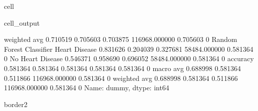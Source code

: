 \documentclass[letterpaper,10pt,english]{jupyterBook}
\begin{document}
\begin{sphinxuseclass}{cell}
\begin{sphinxVerbatimOutput}
\begin{sphinxuseclass}{cell_output}
\begin{sphinxVerbatim}[commandchars=\\\{\}]
                           weighted avg      0.710519   0.705603  0.703875  116968.000000  0.705603    0
Random Forest Classifier   Heart Disease     0.831626   0.204039  0.327681  58484.000000   0.581364    0
                           No Heart Disease  0.546371   0.958690  0.696052  58484.000000   0.581364    0
                           accuracy          0.581364   0.581364  0.581364  0.581364       0.581364    0
                           macro avg         0.688998   0.581364  0.511866  116968.000000  0.581364    0
                           weighted avg      0.688998   0.581364  0.511866  116968.000000  0.581364    0
Name: dummy, dtype: int64

border2
\PYGZhy{}\PYGZhy{}\PYGZhy{}\PYGZhy{}\PYGZhy{}\PYGZhy{}\PYGZhy{}\PYGZhy{}\PYGZhy{}\PYGZhy{}\PYGZhy{}\PYGZhy{}\PYGZhy{}\PYGZhy{}\PYGZhy{}\PYGZhy{}\PYGZhy{}\PYGZhy{}\PYGZhy{}
\end{sphinxVerbatim}

\noindent{}


\end{sphinxuseclass}
\end{sphinxVerbatimOutput}
\end{sphinxuseclass}
\end{document}
